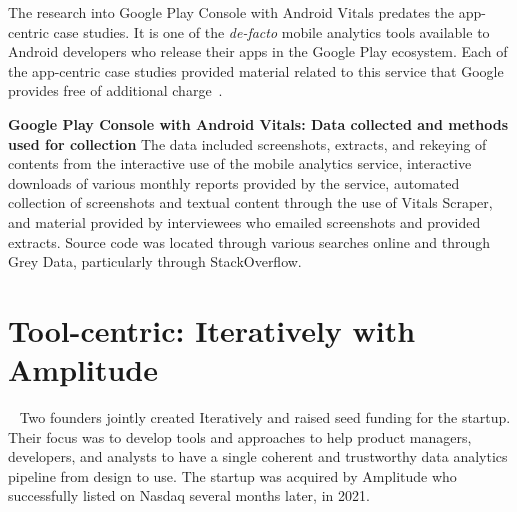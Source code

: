 The research into Google Play Console with Android Vitals predates the app-centric case studies. It is one of the \emph{de-facto} mobile analytics tools available to Android developers who release their apps in the Google Play ecosystem. Each of the app-centric case studies provided material related to this service that Google provides free of additional charge~.

\textbf{Google Play Console with Android Vitals: Data collected and methods used for collection}
The data included screenshots, extracts, and rekeying of contents from the interactive use of the mobile analytics service, interactive downloads of various monthly reports provided by the service, automated collection of screenshots and textual content through the use of Vitals Scraper, and material provided by interviewees who emailed screenshots and provided extracts. Source code was located through various searches online and through Grey Data, particularly through StackOverflow. 






\section{Tool-centric: Iteratively with Amplitude}~\label{case-study-overview-iteratively-with-amplitude}
Two founders jointly created Iteratively and raised seed funding for the startup. Their focus was to develop tools and approaches to help product managers, developers, and analysts to have a single coherent and trustworthy data analytics pipeline from design to use. The startup was acquired by Amplitude who successfully listed on Nasdaq several months later, in 2021. 

